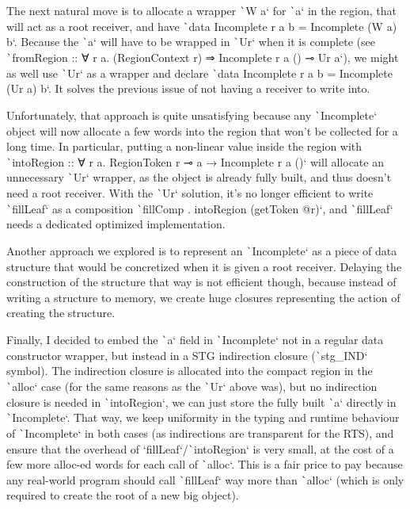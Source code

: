 \documentclass[english]{jflart}
\begin{document}
The next natural move is to allocate a wrapper \texttt`W a` for \texttt`a` in the region, that will act as a root receiver, and have \texttt`data Incomplete r a b = Incomplete (W a) b`. Because the \texttt`a` will have to be wrapped in \texttt`Ur` when it is complete (see \texttt`fromRegion :: ∀ r a. (RegionContext r) ⇒ Incomplete r a () ⊸ Ur a`), we might as well use \texttt`Ur` as a wrapper and declare \texttt`data Incomplete r a b = Incomplete (Ur a) b`. It solves the previous issue of not having a receiver to write into.

Unfortunately, that approach is quite unsatisfying because any \texttt`Incomplete` object will now allocate a few words into the region that won't be collected for a long time. In particular, putting a non-linear value inside the region with \texttt`intoRegion :: ∀ r a. RegionToken r ⊸ a → Incomplete r a ()` will allocate an unnecessary \texttt`Ur` wrapper, as the object is already fully built, and thus doesn't need a root receiver. With the \texttt`Ur` solution, it's no longer efficient to write \texttt`fillLeaf` as a composition \texttt`fillComp . intoRegion (getToken @r)`, and \texttt`fillLeaf` needs a dedicated optimized implementation.

Another approach we explored is to represent an \texttt`Incomplete` as a piece of data structure that would be concretized when it is given a root receiver. Delaying the construction of the structure that way is not efficient though, because instead of writing a structure to memory, we create huge closures representing the action of creating the structure.

Finally, I decided to embed the \texttt`a` field in \texttt`Incomplete` not in a regular data constructor wrapper, but instead in a STG indirection closure (\texttt`stg_IND` symbol). The indirection closure is allocated into the compact region in the \texttt`alloc` case (for the same reasons as the \texttt`Ur` above was), but no indirection closure is needed in \texttt`intoRegion`, we can just store the fully built \texttt`a` directly in \texttt`Incomplete`. That way, we keep uniformity in the typing and runtime behaviour of \texttt`Incomplete` in both cases (as indirections are transparent for the RTS), and ensure that the overhead of `fillLeaf`/\texttt`intoRegion` is very small, at the cost of a few more alloc-ed words for each call of \texttt`alloc`. This is a fair price to pay because any real-world program should call \texttt`fillLeaf` way more than \texttt`alloc` (which is only required to create the root of a new big object).
\end{document}
